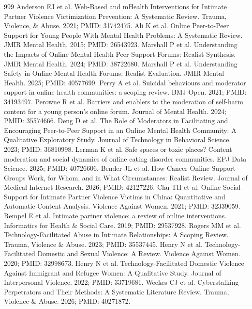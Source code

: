 \documentclass[11pt]{article}
\begin{document}
\begin{thebibliography}{999}
 Anderson EJ et al. Web-Based and mHealth Interventions for Intimate Partner Violence Victimization Prevention: A Systematic Review. Trauma, Violence, \& Abuse. 2021; PMID: 31742475.
 Ali K et al. Online Peer-to-Peer Support for Young People With Mental Health Problems: A Systematic Review. JMIR Mental Health. 2015; PMID: 26543923.
 Marshall P et al. Understanding the Impacts of Online Mental Health Peer Support Forums: Realist Synthesis. JMIR Mental Health. 2024; PMID: 38722680.
 Marshall P et al. Understanding Safety in Online Mental Health Forums: Realist Evaluation. JMIR Mental Health. 2025; PMID: 40577699.
 Perry A et al. Suicidal behaviours and moderator support in online health communities: a scoping review. BMJ Open. 2021; PMID: 34193497.
 Perowne R et al. Barriers and enablers to the moderation of self-harm content for a young person's online forum. Journal of Mental Health. 2024; PMID: 35574666.
 Deng D et al. The Role of Moderators in Facilitating and Encouraging Peer-to-Peer Support in an Online Mental Health Community: A Qualitative Exploratory Study. Journal of Technology in Behavioral Science. 2023; PMID: 36810998.
 Lerman K et al. Safe spaces or toxic places? Content moderation and social dynamics of online eating disorder communities. EPJ Data Science. 2025; PMID: 40726606.
 Bender JL et al. How Cancer Online Support Groups Work, for Whom, and in What Circumstances: Realist Review. Journal of Medical Internet Research. 2026; PMID: 42127226.
 Chu TH et al. Online Social Support for Intimate Partner Violence Victims in China: Quantitative and Automatic Content Analysis. Violence Against Women. 2021; PMID: 32339059.
 Rempel E et al. Intimate partner violence: a review of online interventions. Informatics for Health \& Social Care. 2019; PMID: 29537928.
 Rogers MM et al. Technology-Facilitated Abuse in Intimate Relationships: A Scoping Review. Trauma, Violence \& Abuse. 2023; PMID: 35537445.
 Henry N et al. Technology-Facilitated Domestic and Sexual Violence: A Review. Violence Against Women. 2020; PMID: 32998673.
 Henry N et al. Technology-Facilitated Domestic Violence Against Immigrant and Refugee Women: A Qualitative Study. Journal of Interpersonal Violence. 2022; PMID: 33719681.
 Weekes CJ et al. Cyberstalking Perpetrators and Their Methods: A Systematic Literature Review. Trauma, Violence \& Abuse. 2026; PMID: 40271872.

\end{thebibliography}
\end{document}
